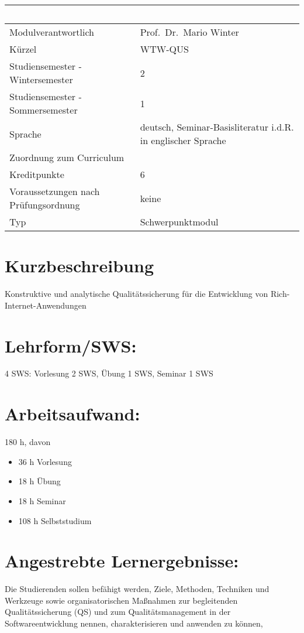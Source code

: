 \begin{longtable}[]{@{}ll@{}}
\toprule
~ & ~\tabularnewline
\midrule
\endhead
Modulverantwortlich & Prof.~Dr.~Mario Winter\tabularnewline
Kürzel & WTW-QUS\tabularnewline
Studiensemester - Wintersemester & 2\tabularnewline
Studiensemester - Sommersemester & 1\tabularnewline
Sprache & deutsch, Seminar-Basisliteratur i.d.R. in englischer
Sprache\tabularnewline
Zuordnung zum Curriculum & ~\tabularnewline
Kreditpunkte & 6\tabularnewline
Voraussetzungen nach Prüfungsordnung & keine\tabularnewline
Typ & Schwerpunktmodul\tabularnewline
\bottomrule
\end{longtable}

\section*{Kurzbeschreibung}\label{kurzbeschreibung-17}

Konstruktive und analytische Qualitätssicherung für die Entwicklung von
Rich-Internet-Anwendungen

\section*{Lehrform/SWS:}\label{lehrformsws-27}

4 SWS: Vorlesung 2 SWS, Übung 1 SWS, Seminar 1 SWS

\section*{Arbeitsaufwand:}\label{arbeitsaufwand-27}

180 h, davon

\begin{itemize}
\item
  36 h Vorlesung
\item
  18 h Übung
\item
  18 h Seminar
\item
  108 h Selbststudium
\end{itemize}

\section*{Angestrebte
Lernergebnisse:}\label{angestrebte-lernergebnisse-27}

Die Studierenden sollen befähigt werden, Ziele, Methoden, Techniken und
Werkzeuge sowie organisatorischen Maßnahmen zur begleitenden
Qualitätssicherung (QS) und zum Qualitätsmanagement in der
Softwareentwicklung nennen, charakterisieren und anwenden zu können,

